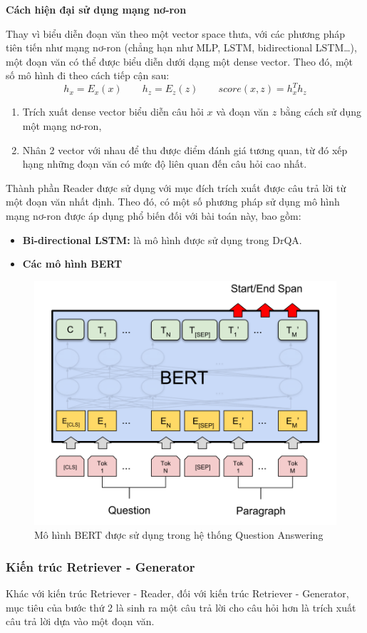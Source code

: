 \begin{flushleft}
\textbf{Cách hiện đại sử dụng mạng nơ-ron}\\
\end{flushleft}

Thay vì biểu diễn đoạn văn theo một vector space thưa, với các phương pháp tiên tiến như mạng nơ-ron (chẳng hạn như MLP, LSTM, bidirectional LSTM\dots), một đoạn văn có thể được biểu diễn dưới dạng một dense vector. Theo đó, một số mô hình đi theo cách tiếp cận sau:
\[
    h_x = E_x(x) \qquad h_z = E_z(z) \qquad score(x, z) = h_x^Th_z
\]

\begin{enumerate}
    \item Trích xuất dense vector biểu diễn câu hỏi $x$ và đoạn văn $z$ bằng cách sử dụng một mạng nơ-ron,
    \item Nhân 2 vector với nhau để thu được điểm đánh giá tương quan, từ đó xếp hạng những đoạn văn có mức độ liên quan đến câu hỏi cao nhất.
\end{enumerate}

Thành phần Reader được sử dụng với mục đích trích xuất được câu trả lời từ một đoạn văn nhất định. Theo đó, có một số phương pháp sử dụng mô hình mạng nơ-ron được áp dụng phổ biến đối với bài toán này, bao gồm:
\begin{itemize}
    \item \textbf{Bi-directional LSTM:} là mô hình được sử dụng trong DrQA.
    \item \textbf{Các mô hình BERT}
\end{itemize}

\begin{figure}[h!]
    \centering
    \includegraphics[width=0.5\linewidth]{img/arch/BERT-RC.png}
    \caption{Mô hình BERT được sử dụng trong hệ thống Question Answering}
    \label{fig:arch_rr_bert}
\end{figure}


\subsubsection{Kiến trúc Retriever - Generator}
Khác với kiến trúc Retriever - Reader, đối với kiến trúc Retriever - Generator, mục tiêu của bước thứ 2 là sinh ra một câu trả lời cho câu hỏi hơn là trích xuất câu trả lời dựa vào một đoạn văn.

